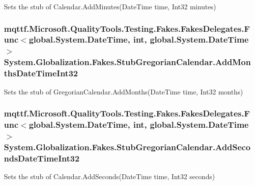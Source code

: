 Sets the stub of Calendar.\-Add\-Minutes(\-Date\-Time time, Int32 minutes)

\hypertarget{class_system_1_1_globalization_1_1_fakes_1_1_stub_gregorian_calendar_a057ab65ffac017bad962996eb887a49e}{
\subsubsection[{Add\-Months\-Date\-Time\-Int32}]{\setlength{\rightskip}{0pt plus 5cm}mqttf.\-Microsoft.\-Quality\-Tools.\-Testing.\-Fakes.\-Fakes\-Delegates.\-Func$<$global.\-System.\-Date\-Time, int, global.\-System.\-Date\-Time$>$ System.\-Globalization.\-Fakes.\-Stub\-Gregorian\-Calendar.\-Add\-Months\-Date\-Time\-Int32}}\label{class_system_1_1_globalization_1_1_fakes_1_1_stub_gregorian_calendar_a057ab65ffac017bad962996eb887a49e}


Sets the stub of Gregorian\-Calendar.\-Add\-Months(\-Date\-Time time, Int32 months)

\hypertarget{class_system_1_1_globalization_1_1_fakes_1_1_stub_gregorian_calendar_a3f3882fcf81ca21106a400617cc7d853}{
\subsubsection[{Add\-Seconds\-Date\-Time\-Int32}]{\setlength{\rightskip}{0pt plus 5cm}mqttf.\-Microsoft.\-Quality\-Tools.\-Testing.\-Fakes.\-Fakes\-Delegates.\-Func$<$global.\-System.\-Date\-Time, int, global.\-System.\-Date\-Time$>$ System.\-Globalization.\-Fakes.\-Stub\-Gregorian\-Calendar.\-Add\-Seconds\-Date\-Time\-Int32}}\label{class_system_1_1_globalization_1_1_fakes_1_1_stub_gregorian_calendar_a3f3882fcf81ca21106a400617cc7d853}


Sets the stub of Calendar.\-Add\-Seconds(\-Date\-Time time, Int32 seconds)

